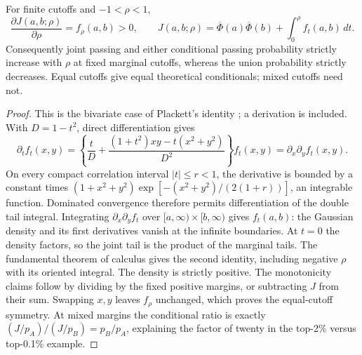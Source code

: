 \begin{proposition}
\label{tw:plackett}
For finite cutoffs and \(-1<\rho<1\),
\begin{equation}
 \frac{\partial J(a,b;\rho)}{\partial\rho}=f_\rho(a,b)>0,
 \qquad
 J(a,b;\rho)=\overline\Phi(a)\overline\Phi(b)
                 +\int_0^\rho f_t(a,b)\,dt.
 \label{eq:tw-plackett-proof}
\end{equation}
Consequently joint passing and either conditional passing probability
strictly increase with \(\rho\) at fixed marginal cutoffs, whereas the
union probability strictly decreases. Equal cutoffs give equal theoretical
conditionals; mixed cutoffs need not.
\end{proposition}
\begin{proof}
This is the bivariate case of Plackett's identity \citep{plackett1954}; a
derivation is included. With \(D=1-t^2\), direct differentiation gives
\[
 \partial_t f_t(x,y)=
 \left\{\frac{t}{D}+\frac{(1+t^2)xy-t(x^2+y^2)}{D^2}\right\}f_t(x,y)
 =\partial_x\partial_y f_t(x,y).
\]
On every compact correlation interval \(|t|\leq r<1\), the derivative is
bounded by a constant times
\((1+x^2+y^2)\exp[-(x^2+y^2)/(2(1+r))]\), an integrable function.
Dominated convergence therefore permits differentiation of the double
tail integral. Integrating \(\partial_x\partial_y f_t\) over
\([a,\infty)\times[b,\infty)\) gives \(f_t(a,b)\): the Gaussian
density and its first derivatives vanish at the infinite boundaries.
At \(t=0\) the density factors, so the joint tail is the product of the
marginal tails. The fundamental theorem of calculus gives the second
identity, including negative \(\rho\) with its oriented integral.
The density is strictly positive. The monotonicity claims follow by
dividing by the fixed positive margins, or subtracting \(J\) from their
sum. Swapping \(x,y\) leaves \(f_\rho\) unchanged, which proves the
equal-cutoff symmetry. At mixed margins the conditional ratio is exactly
\((J/p_A)/(J/p_B)=p_B/p_A\), explaining the factor of twenty in the
top-2\% versus top-0.1\% example.
\end{proof}

